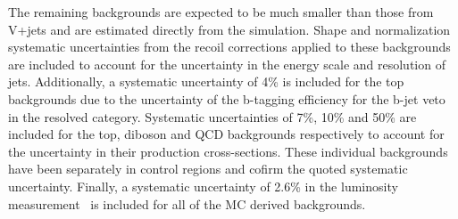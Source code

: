 The remaining backgrounds are expected to be much smaller than those from V+jets and are estimated directly from the simulation. 
Shape and normalization systematic uncertainties from the recoil corrections applied to these 
backgrounds are included to account for the uncertainty in the energy scale and resolution 
of jets. Additionally, a systematic uncertainty of 4\% is included for the top backgrounds due to the uncertainty of 
the b-tagging efficiency for the b-jet veto in the resolved category. Systematic uncertainties of 7\%, 10\% and 50\% are included for the top, diboson and QCD backgrounds respectively to account 
for the uncertainty in their production cross-sections. These individual backgrounds have been separately in control regions and cofirm the quoted systematic uncertainty. Finally, a systematic uncertainty of 2.6\% in the luminosity measurement~\cite{lumi} is included for 
all of the MC derived backgrounds.



